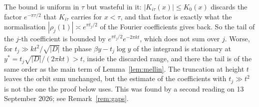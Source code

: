 \documentclass[11pt,a4paper]{article}
\theoremstyle{remark}\newtheorem{remark}[theorem]{Remark}
\begin{document}
The bound is uniform in $\tau$ but wasteful in it: $|K_{i\tau}(x)|\le K_0(x)$ discards the factor $e^{-\pi\tau/2}$ that
$K_{i\tau}$ carries for $x<\tau$, and that factor is exactly what the normalisation $|\rho_j(1)|\asymp e^{\pi t_j/2}$ of
the Fourier coefficients gives back. So the tail of the $j$-th coefficient is bounded by $e^{\pi t_j/2}e^{-2\pi kt}$,
which does not sum over $j$. Worse, for $t_j\gg kt^2/\sqrt{|D|}$ the phase $\beta y-t_j\log y$ of the integrand is
stationary at $y^\ast=t_j\sqrt{|D|}/(2\pi kt)>t$, inside the discarded range, and there the tail is of the same order
as the main term of Lemma~\ref{lem:mellin}. The truncation at height $t$ leaves the orbit sum unchanged, but the
estimate of the coefficients with $t_j\gg t^2$ is not the one the proof below uses. This was found by a second reading
on 13 September 2026; see Remark~\ref{rem:gaps}.
\end{document}
